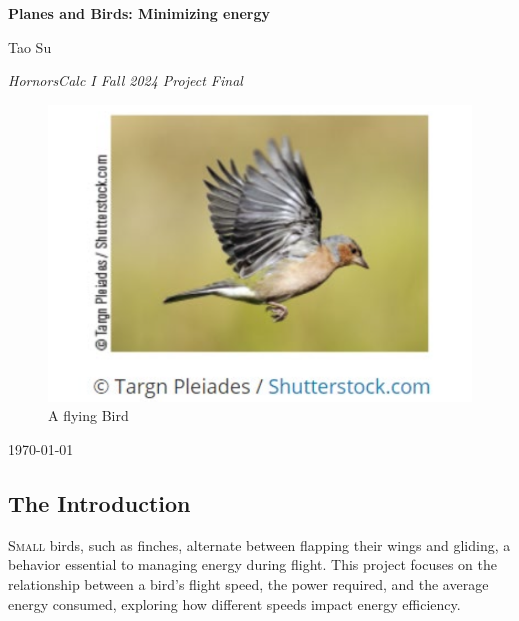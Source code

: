 \documentclass{article}
\begin{document}
\begin{titlepage}
    \centering
    \vspace*{1cm}
    
    \Huge
    \textbf{Planes and Birds: Minimizing energy}
    
    \vspace{0.5cm}
    
    \Large
    Tao Su
    \vspace{1.5cm}

    \large 
    \textit{HornorsCalc I Fall 2024 Project Final}
    \vfill

    \begin{figure}[h]
        \centering
        \includegraphics[width=1\textwidth]{coverPage.png}
        \caption{\small A flying Bird}
        \label{fig:cover}
    \end{figure}
            
    \Large
    \today  %
    
\end{titlepage}

\newpage

\subsection*{The Introduction}


\lettrine[lines=2]{S}{mall} birds, such as finches, alternate between flapping their wings and gliding, a behavior essential to managing energy during flight. This project focuses on the relationship between a bird’s flight speed, the power required, and the average energy consumed, exploring how different speeds impact energy efficiency.
\end{document}
